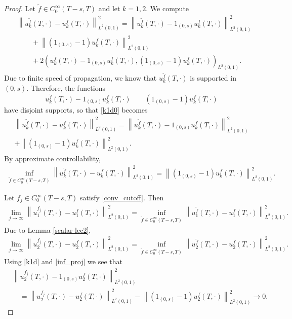\documentclass[12pt,oneside,final]{amsart}
\begin{document}
\begin{proof}
Let $\tilde f \in C_0^\infty(T-s, T)$ and let $k=1,2$. We compute
\begin{align}\label{k1d0}
	\nonumber&\left\|u_k^{\tilde f}(T,\cdot) - u_k^{f}(T,\cdot)\right\|_{L^2(0,1)}^2 = \left\|u_k^{\tilde f}(T,\cdot) - 1_{(0,s)}u_k^{f}(T,\cdot)\right\|_{L^2(0,1)}^2 \\
	&\qquad + \left\|\left(1_{(0,s)} - 1\right) u_k^{f}(T,\cdot)\right\|_{L^2(0,1)}^2\\
	\nonumber&\qquad + 2\left(u_k^{\tilde f}(T,\cdot) - 1_{(0,s)}u_k^{f}(T,\cdot), \left(1_{(0,s)} - 1\right) u_k^{f}(T,\cdot)\right)_{L^2(0,1)}.
\end{align}
Due to finite speed of propagation, we know that $u_k^{\tilde f}(T,\cdot)$ is supported in $(0,s)$. Therefore, the functions
\begin{equation*}
	u_k^{\tilde f}(T,\cdot) - 1_{(0,s)}u_k^{f}(T,\cdot) 
	\qquad 
	 \left(1_{(0,s)} - 1\right) u_k^{f}(T,\cdot)
\end{equation*}
have disjoint supports, so that \eqref{k1d0} becomes
\begin{multline}\label{k1d}
	\left\|u_k^{\tilde f}(T,\cdot) - u_k^{f}(T,\cdot)\right\|_{L^2(0,1)}^2 = \left\|u_k^{\tilde f}(T,\cdot) - 1_{(0,s)}u_k^{f}(T,\cdot)\right\|_{L^2(0,1)}^2 \\
	+ \left\|\left(1_{(0,s)} - 1\right) u_k^{f}(T,\cdot)\right\|_{L^2(0,1)}^2.
\end{multline}
By approximate controllability, 
	\begin{align}\label{inf_proj}
\inf_{\tilde{f}\in C_0^\infty(T - s,T)} \left\| u_k^{\tilde{f}}(T,\cdot) - u_k^f(T,\cdot)\right\|_{L^2(0,1)}^2
= 
 \left\|\left(1_{(0,s)} - 1\right) u_k^{f}(T,\cdot)\right\|_{L^2(0,1)}^2.
	\end{align}

Let $f_j \in C_0^\infty(T-s, T)$ satisfy \eqref{conv_cutoff}.
Then
\begin{multline*}
	\lim_{j\rightarrow\infty}\left\|u_1^{f_j}(T,\cdot) - u_1^{f}(T,\cdot)\right\|_{L^2(0,1)}^2 
	=\inf_{\tilde{f}\in C_0^\infty(T - s,T)} \left\| u_1^{\tilde{f}}(T,\cdot) - u_1^f(T,\cdot)\right\|_{L^2(0,1)}^2.
\end{multline*}
Due to Lemma \ref{scalar lec2}, 
\begin{multline*}
	\lim_{j\rightarrow\infty}\left\|u_2^{f_j}(T,\cdot) - u_2^{f}(T,\cdot)\right\|_{L^2(0,1)}^2 
	=\inf_{\tilde{f}\in C_0^\infty(T - s,T)} \left\| u_2^{\tilde{f}}(T,\cdot) - u_2^f(T,\cdot)\right\|_{L^2(0,1)}^2.
\end{multline*}
Using \eqref{k1d} and \eqref{inf_proj} we see that
\begin{align*}
&\left\|u_2^{f_j}(T,\cdot) - 1_{(0,s)}u_2^{f}(T,\cdot)\right\|_{L^2(0,1)}^2 
\\&\quad
=
	\left\|u_2^{f_j}(T,\cdot) - u_2^{f}(T,\cdot)\right\|_{L^2(0,1)}^2  
	- \left\|\left(1_{(0,s)} - 1\right) u_2^{f}(T,\cdot)\right\|_{L^2(0,1)}^2 \to 0.
\end{align*}
\end{proof}
\end{document}
